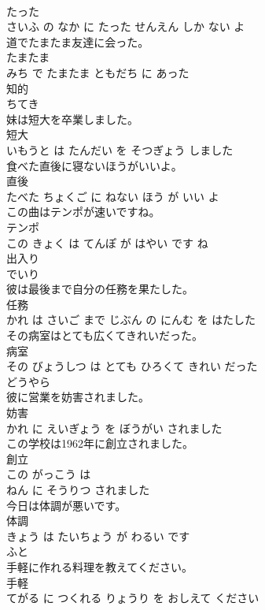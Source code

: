 \documentclass[8pt]{extreport}
\begin{document}
\begin{CJK}{UTF8}{min}
\\	たった 
\\	さいふ の なか に たった せんえん しか ない よ			
\\	道でたまたま友達に会った。	
\\	たまたま 
\\	みち で たまたま ともだち に あった			
\\	知的	
\\	ちてき		
\\	妹は短大を卒業しました。	
\\	短大 
\\	いもうと は たんだい を そつぎょう しました			
\\	食べた直後に寝ないほうがいいよ。	
\\	直後 
\\	たべた ちょくご に ねない ほう が いい よ			
\\	この曲はテンポが速いですね。	
\\	テンポ 
\\	この きょく は てんぽ が はやい です ね			
\\	出入り	
\\	でいり		
\\	彼は最後まで自分の任務を果たした。	
\\	任務 
\\	かれ は さいご まで じぶん の にんむ を はたした			
\\	その病室はとても広くてきれいだった。	
\\	病室 
\\	その びょうしつ は とても ひろくて きれい だった			
\\	どうやら	
\\	彼に営業を妨害されました。	
\\	妨害 
\\	かれ に えいぎょう を ぼうがい されました			
\\	この学校は1962年に創立されました。	
\\	創立 
\\	この がっこう は 
\\	ねん に そうりつ されました			
\\	今日は体調が悪いです。	
\\	体調 
\\	きょう は たいちょう が わるい です			
\\	ふと	
\\	手軽に作れる料理を教えてください。	
\\	手軽 
\\	てがる に つくれる りょうり を おしえて ください			

\end{CJK}
\end{document}
